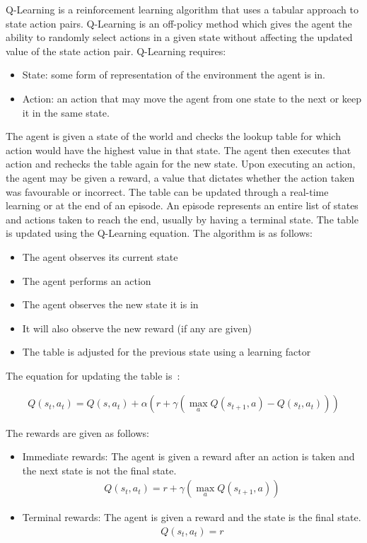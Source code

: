 Q-Learning is a reinforcement learning algorithm that uses a tabular approach to
state action pairs. Q-Learning is an off-policy method which gives the agent the
ability to randomly select actions in a given state without affecting the
updated value of the state action pair. Q-Learning requires:

\begin{itemize}
    \item State: some form of representation of the environment the agent is in.
    \item Action: an action that may move the agent from one state to the next
        or keep it in the same state.
\end{itemize}

The agent is given a state of the world and checks the lookup table for which
action would have the highest value in that state. The agent then executes that
action and rechecks the table again for the new state. Upon executing an action,
the agent may be given a reward, a value that dictates whether the action taken
was favourable or incorrect. The table can be updated through a real-time
learning or at the end of an episode. An episode represents an entire list of
states and actions taken to reach the end, usually by having a terminal state.
The table is updated using the Q-Learning equation. The algorithm is as follows:

\begin{itemize}
    \item The agent observes its current state
    \item The agent performs an action
    \item The agent observes the new state it is in
    \item It will also observe the new reward (if any are given)
    \item The table is adjusted for the previous state using a learning factor
\end{itemize}

The equation for updating the table is~\cite{watkins1992q}:

\begin{align}
    Q(s_t,a_t) = Q(s,a_t) + \alpha (r + \gamma (\max_a Q(s_{t+1}, a) - Q(s_t,a_t)))
\end{align}

The rewards are given as follows:

\begin{itemize}
    \item Immediate rewards: The agent is given a reward after an action is
        taken and the next state is not the final state.
        \begin{align} \label{eq:q_update}
            Q(s_t,a_t) = r + \gamma (\max_a Q(s_{t+1}, a))
        \end{align}
    \item Terminal rewards: The agent is given a reward and the state is the
        final state.
        \begin{align}
            Q(s_t,a_t) = r
        \end{align}
\end{itemize}

